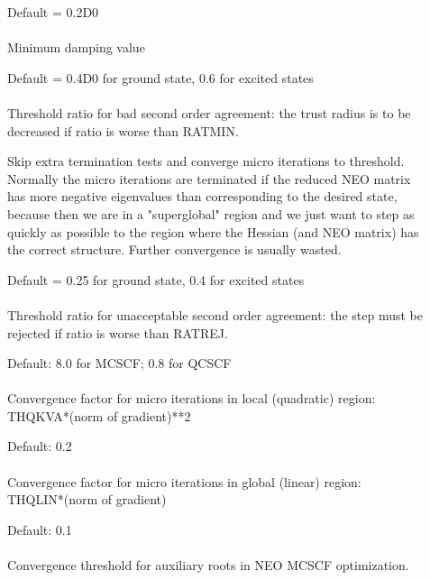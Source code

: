 \begin{description}
\item[]
  Default = 0.2D0\\
   \\
  Minimum damping value

\item[]
  Default = 0.4D0 for ground state, 0.6 for excited states\\
   \\
  Threshold ratio for bad second order agreement: the trust radius is
  to be decreased if ratio is worse than RATMIN.

\item[]
  Skip extra termination tests and converge micro iterations to
  threshold.   Normally the micro iterations are terminated if the
  reduced NEO matrix has more negative eigenvalues than corresponding
  to the desired state, because then we are in a "superglobal" region
  and we just want to step as quickly as possible to the region where
  the Hessian (and NEO matrix) has the correct structure.  Further
  convergence is usually wasted.

\item[]
  Default = 0.25 for ground state, 0.4 for excited states\\
   \\
  Threshold ratio for unacceptable second order agreement: the step
  must be rejected if ratio is worse than RATREJ.

\item[]
  Default: 8.0 for MCSCF; 0.8 for QCSCF\\
   \\
  Convergence factor for micro iterations in local (quadratic) region:
  THQKVA*(norm of gradient)**2

\item[]
  Default: 0.2\\
   \\
  Convergence factor for micro iterations in global (linear) region: \\
  THQLIN*(norm of gradient)

\item[]
  Default: 0.1\\
   \\
  Convergence threshold for auxiliary roots in NEO MCSCF optimization.


\end{description}
